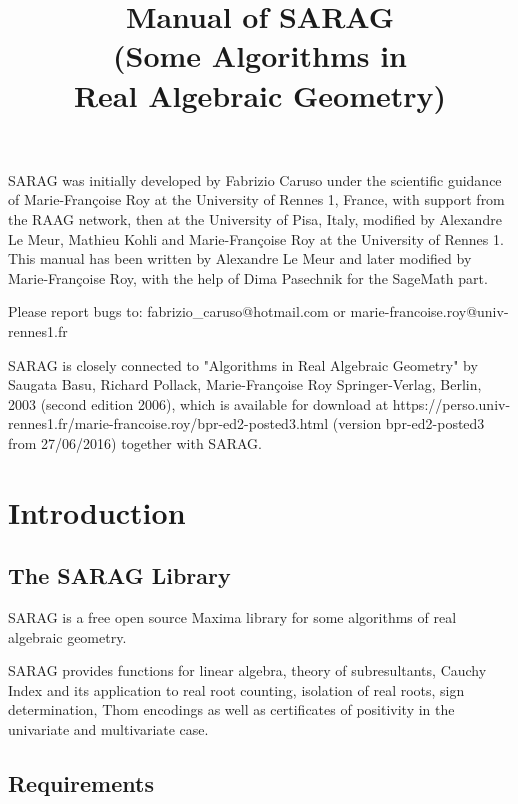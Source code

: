 \documentclass{article}
\begin{document}
\title{
  Manual of SARAG\\
  (Some Algorithms in\\
  Real Algebraic Geometry)
}

\maketitle



SARAG was initially developed by Fabrizio Caruso under the scientific guidance of
Marie-Fran{\c c}oise Roy at the University of Rennes 1, France, with support
from the RAAG network, then at the University of Pisa, Italy,
modified by Alexandre Le Meur, Mathieu Kohli and Marie-Fran{\c c}oise Roy at
the University of Rennes 1. This manual has been written by Alexandre Le Meur
and later modified by Marie-Fran{\c c}oise Roy, with the  help of Dima Pasechnik
 for the SageMath part.

Please report bugs to: fabrizio\_caruso@hotmail.com or
marie-francoise.roy@univ-rennes1.fr

SARAG is closely connected to "Algorithms in Real Algebraic Geometry" by
Saugata Basu, Richard Pollack, Marie-Fran{\c c}oise Roy Springer-Verlag,
Berlin, 2003 (second edition 2006), which  is available for
download at
https://perso.univ-rennes1.fr/marie-francoise.roy/bpr-ed2-posted3.html
(version bpr-ed2-posted3 from 27/06/2016)
together with SARAG.

\section{Introduction}

\subsection{The SARAG Library}

SARAG is a free open source Maxima library for some algorithms of real algebraic
geometry.

SARAG provides functions for linear algebra, theory of subresultants, Cauchy
Index and its application to real root counting, isolation of real roots, sign
determination, Thom encodings as well as certificates of positivity in the
univariate and multivariate case.

\subsection{Requirements}
\end{document}
